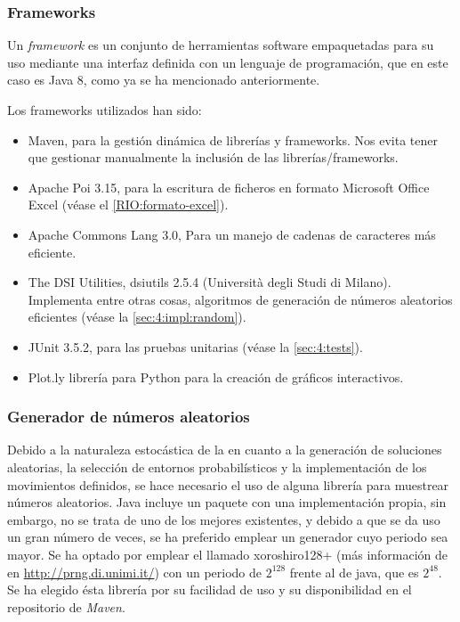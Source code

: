 \subsubsection{Frameworks}
Un \textit{framework} es un conjunto de herramientas software empaquetadas para su uso mediante una interfaz definida con un lenguaje de programación, que en este caso es Java 8, como ya se ha mencionado anteriormente.

Los frameworks utilizados han sido:

\begin{itemize}
	\item Maven, para la gestión dinámica de librerías y frameworks. Nos evita tener que gestionar manualmente la inclusión de las librerías/frameworks.
	\item Apache Poi 3.15, para la escritura de ficheros en formato Microsoft Office Excel (véase el \ref{RIO:formato-excel}).
	\item Apache Commons Lang 3.0, Para un manejo de cadenas de caracteres más eficiente.
	\item The DSI Utilities, dsiutils 2.5.4 (Università degli Studi di Milano). Implementa entre otras cosas, algoritmos de generación de números aleatorios eficientes (véase la \autoref{sec:4:impl:random}).
	\item JUnit 3.5.2, para las pruebas unitarias (véase la \autoref{sec:4:tests}).
	\item Plot.ly librería para Python para la creación de gráficos interactivos.
\end{itemize}

\subsubsection{Generador de números aleatorios}
\label{sec:4:impl:random}

Debido a la naturaleza estocástica de la \fasedos{} en cuanto a la generación de soluciones aleatorias, la selección de entornos probabilísticos y la implementación de los movimientos definidos, se hace necesario el uso de alguna librería para muestrear números aleatorios. Java incluye un paquete con una implementación propia, sin embargo, no se trata de uno de los mejores existentes, y debido a que se da uso un gran número de veces, se ha preferido emplear un generador cuyo periodo sea mayor. Se ha optado por emplear el llamado xoroshiro128+ (más información de en \url{http://prng.di.unimi.it/}) con un periodo de $2^{128}$ frente al de java, que es $2^{48}$. Se ha elegido ésta librería por su facilidad de uso y su disponibilidad en el repositorio de \textit{Maven}.

